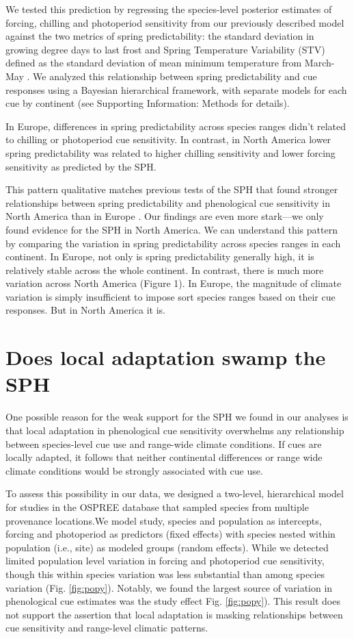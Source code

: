 \documentclass[12pt]{article}
\begin{document}
We tested this prediction by regressing the species-level posterior estimates of forcing, chilling and photoperiod sensitivity from our previously described model against the two metrics of spring predictability: the standard deviation in growing degree days to last frost and Spring Temperature Variability (STV) defined as the standard deviation of mean minimum temperature from March-May \citep[See Supporting Information Methods]{Zohner:2017aa}. We analyzed this relationship between spring predictability and cue responses using a Bayesian hierarchical framework, with separate models for each cue by continent (see Supporting Information: Methods for details). 

In Europe, differences in spring predictability across species ranges didn't related to chilling or photoperiod cue sensitivity. In contrast, in North America lower spring predictability was related to higher chilling sensitivity and lower forcing sensitivity as predicted by the SPH. 

This pattern qualitative matches previous tests of the SPH that found stronger relationships between spring predictability and phenological cue sensitivity in North America than in Europe \citep{Zohner:2017aa}. Our findings are even more stark---we only found evidence for the SPH in North America. We can understand this pattern by comparing the variation in spring predictability across species ranges in each continent. In Europe, not only is spring predictability generally high, it is relatively stable across the whole continent. In contrast, there is much more variation across North America (Figure 1). In Europe, the magnitude of climate variation is simply insufficient to impose sort species ranges based on their cue responses. But in North America it is.

\section*{Does local adaptation swamp the SPH}
One possible reason for the weak support for the SPH we found in our analyses is that local adaptation in phenological cue sensitivity overwhelms any relationship between species-level cue use and range-wide climate conditions. If cues are locally adapted, it follows that neither continental differences or range wide climate conditions would be strongly associated with cue use. 

To assess this possibility in our data, we designed a two-level, hierarchical model for studies in the OSPREE database that sampled species from multiple provenance locations.We model study, species and population as intercepts, forcing and photoperiod as predictors (fixed effects) with species nested within population (i.e., site) as modeled groups (random effects). While we detected limited population level variation in forcing and photoperiod cue sensitivity, though this within species variation was less substantial than among species variation (Fig. \ref{fig:popy}). Notably, we found the largest source of variation in phenological cue estimates was the study effect Fig. \ref{fig:popy}). This result does not support the assertion that local adaptation is masking relationships between cue sensitivity and range-level climatic patterns.
\end{document}
